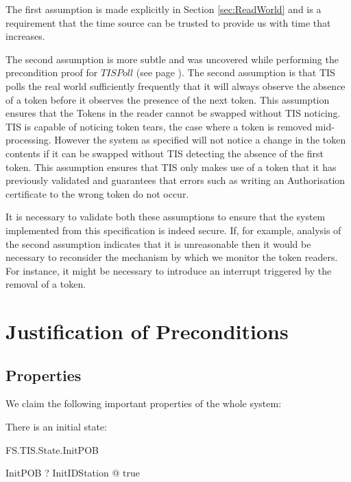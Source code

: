 The first assumption is made explicitly in Section
\ref{sec:ReadWorld} and is a requirement that the 
time source can be trusted to provide us with time that increases.

The second assumption is more subtle and was uncovered while
performing the precondition proof for $TISPoll$ (see page
\pageref{sec:PollPre}). The second assumption
is that TIS polls the real world sufficiently frequently that it will
always observe the absence of a token before it observes the presence
of the next token. This assumption ensures that the Tokens in the
reader cannot be swapped without TIS noticing. TIS is capable of
noticing token tears, the case where a token is removed mid-processing.
However the system as specified will not notice a change in the token
contents if it can be swapped without TIS detecting the absence of the
first token. This assumption ensures that TIS only makes use of a
token that it has previously validated and guarantees that errors such
as writing an Authorisation certificate to the wrong token do not occur.

It is necessary to validate both these assumptions to ensure that the 
system implemented from this specification is indeed secure. 
If, for example, analysis of the second assumption indicates that 
it is unreasonable then 
it would be necessary to reconsider the mechanism by which we monitor 
the token readers. For instance, it might be necessary to introduce an 
interrupt triggered by the removal of a token.%
\chapter{Justification of Preconditions}
\label{sec:Pre}

\section{Properties}
We claim the following important properties of the whole system:

There is an initial state:

\begin{Zpobtrace}{FS.TIS.State.InitPOB}
\begin{theorem}{InitPOB} \vdash? 
    \exists InitIDStation @ true
\end{theorem}
\end{Zpobtrace}


